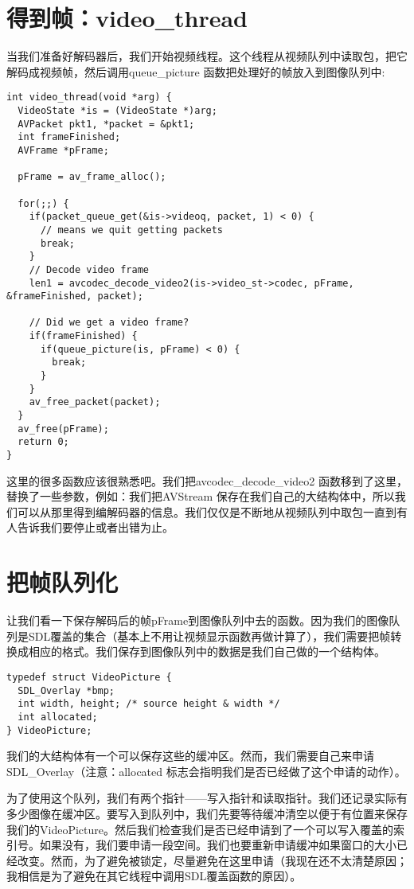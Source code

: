 \section{得到帧：video_thread}
当我们准备好解码器后，我们开始视频线程。这个线程从视频队列中读取包，把它解码成视频帧，然后调用queue_picture 函数把处理好的帧放入到图像队列中:
\begin{lstlisting}
int video_thread(void *arg) {
  VideoState *is = (VideoState *)arg;
  AVPacket pkt1, *packet = &pkt1;
  int frameFinished;
  AVFrame *pFrame;

  pFrame = av_frame_alloc();

  for(;;) {
    if(packet_queue_get(&is->videoq, packet, 1) < 0) {
      // means we quit getting packets
      break;
    }
    // Decode video frame
    len1 = avcodec_decode_video2(is->video_st->codec, pFrame, &frameFinished, packet);

    // Did we get a video frame?
    if(frameFinished) {
      if(queue_picture(is, pFrame) < 0) {
        break;
      }
    }
    av_free_packet(packet);
  }
  av_free(pFrame);
  return 0;
}
\end{lstlisting}

这里的很多函数应该很熟悉吧。我们把avcodec_decode_video2 函数移到了这里，替换了一些参数，例如：我们把AVStream 保存在我们自己的大结构体中，所以我们可以从那里得到编解码器的信息。我们仅仅是不断地从视频队列中取包一直到有人告诉我们要停止或者出错为止。

\section{把帧队列化}

让我们看一下保存解码后的帧pFrame到图像队列中去的函数。因为我们的图像队列是SDL覆盖的集合（基本上不用让视频显示函数再做计算了），我们需要把帧转换成相应的格式。我们保存到图像队列中的数据是我们自己做的一个结构体。

\begin{lstlisting}
typedef struct VideoPicture {
  SDL_Overlay *bmp;
  int width, height; /* source height & width */
  int allocated;
} VideoPicture;
\end{lstlisting}

我们的大结构体有一个可以保存这些的缓冲区。然而，我们需要自己来申请SDL_Overlay（注意：allocated 标志会指明我们是否已经做了这个申请的动作）。

为了使用这个队列，我们有两个指针——写入指针和读取指针。我们还记录实际有多少图像在缓冲区。要写入到队列中，我们先要等待缓冲清空以便于有位置来保存我们的VideoPicture。然后我们检查我们是否已经申请到了一个可以写入覆盖的索引号。如果没有，我们要申请一段空间。我们也要重新申请缓冲如果窗口的大小已经改变。然而，为了避免被锁定，尽量避免在这里申请（我现在还不太清楚原因；我相信是为了避免在其它线程中调用SDL覆盖函数的原因）。

